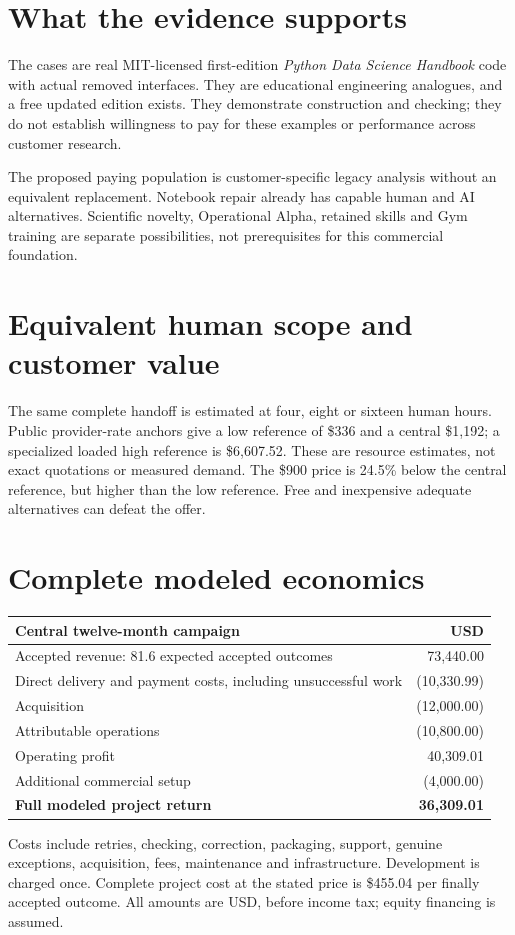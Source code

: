 \documentclass[10pt,letterpaper]{article}
\begin{document}
\section{What the evidence supports}
The cases are real MIT-licensed first-edition \emph{Python Data Science Handbook} code with actual removed interfaces. They are educational engineering analogues, and a free updated edition exists. They demonstrate construction and checking; they do not establish willingness to pay for these examples or performance across customer research.

The proposed paying population is customer-specific legacy analysis without an equivalent replacement. Notebook repair already has capable human and AI alternatives. Scientific novelty, Operational Alpha, retained skills and Gym training are separate possibilities, not prerequisites for this commercial foundation.

\section{Equivalent human scope and customer value}
The same complete handoff is estimated at four, eight or sixteen human hours. Public provider-rate anchors give a low reference of \$336 and a central \$1,192; a specialized loaded high reference is \$6,607.52. These are resource estimates, not exact quotations or measured demand. The \$900 price is 24.5\% below the central reference, but higher than the low reference. Free and inexpensive adequate alternatives can defeat the offer.

\newpage
\section{Complete modeled economics}
\begin{tabularx}{\linewidth}{@{}Xr@{}}\toprule
Central twelve-month campaign & USD\\\midrule
Accepted revenue: 81.6 expected accepted outcomes & 73,440.00\\
Direct delivery and payment costs, including unsuccessful work & (10,330.99)\\
Acquisition & (12,000.00)\\
Attributable operations & (10,800.00)\\\midrule
Operating profit & 40,309.01\\
Additional commercial setup & (4,000.00)\\\midrule
\textbf{Full modeled project return} & \textbf{36,309.01}\\\bottomrule
\end{tabularx}
Costs include retries, checking, correction, packaging, support, genuine exceptions, acquisition, fees, maintenance and infrastructure. Development is charged once. Complete project cost at the stated price is \$455.04 per finally accepted outcome. All amounts are USD, before income tax; equity financing is assumed.
\end{document}
